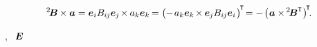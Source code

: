 \nopagebreak\vspace{-0.3em}\begin{equation*}\label{crossproductisnotcommutative}
{^2\hspace{-0.16em}\bm{B}} \hspace{-0.1ex} \times \bm{a}
= \bm{e}_i \somebivalenttensorcomponents{i\hspace{-0.1ex}j} \bm{e}_{\hspace{-0.1ex}j} \hspace{-0.25ex} \times \hspace{-0.1ex} a_k \bm{e}_k \hspace{-0.2ex}
= \bigl( \hspace{-0.1ex} - \hspace{.25ex} a_k \bm{e}_k \hspace{-0.25ex} \times \hspace{-0.1ex} \bm{e}_{\hspace{-0.1ex}j} \somebivalenttensorcomponents{i\hspace{-0.1ex}j} \bm{e}_i \hspace{.16ex} \bigr)^{\hspace{-0.25ex}\T} \hspace{-0.4ex}
= - \hspace{.25ex} \bigl( \hspace{.12ex} \bm{a} \times \hspace{-0.2ex} {^2\hspace{-0.16em}\bm{B}^{\T}} \hspace{.1ex} \bigr)^{\hspace{-0.3ex}\T}
\hspace{-0.4ex} .
\end{equation*}

\vspace{-0.15em} \noindent
{}, ~${\hspace{-0.2ex}\bm{E}}$ ~


